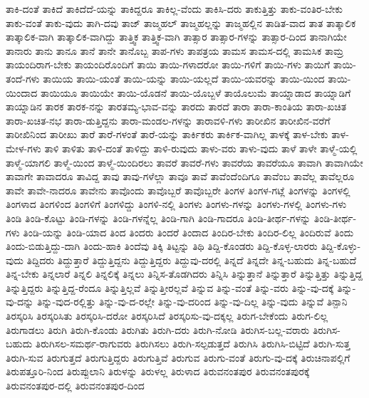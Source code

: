 {ತಾಕಿ-ದಂತೆ
ತಾಕಿದೆ
ತಾಕಿದೆದೆ-ಯನ್ನು
ತಾಕಿದ್ದರೂ
ತಾಕಿಲ್ಲ-ವೆಂದು
ತಾಕಿಸಿ-ದರು
ತಾಕುತ್ತಿತ್ತು
ತಾಕು-ವಂತಿರ-ಬೇಕು
ತಾಕು-ವಂತೆ
ತಾಕು-ವುದು
ತಾಗಿ-ದವು
ತಾಜ್
ತಾಜ್ಮಹಲ್
ತಾಜ್ಮಹಲ್ಲನ್ನು
ತಾಜ್ಮಹಲ್ಲಿನ
ತಾಡಿತ-ವಾದ
ತಾತ
ತಾತ್ಕಾಲಿಕ
ತಾತ್ಕಾಲಿಕ-ವಾಗಿ
ತಾತ್ಕಾಲಿಕ-ವಾಗಿದ್ದು
ತಾತ್ತ್ವಿಕ
ತಾತ್ತ್ವಿಕ-ವಾಗಿ
ತಾತ್ಸಾರ
ತಾತ್ಸಾರ-ಗಳನ್ನು
ತಾತ್ಸಾರ-ದಿಂದ
ತಾನಾಗಿಯೇ
ತಾನಾರು
ತಾನು
ತಾನೂ
ತಾನೆ
ತಾನೇ
ತಾನೊಬ್ಬ
ತಾಪ-ಗಳು
ತಾಪತ್ರಯ
ತಾಮಸ
ತಾಮಸ-ದಲ್ಲಿ
ತಾಮಸಿಕ
ತಾಮ್ರ
ತಾಯಂದಿರಾಗ-ಬೇಕು
ತಾಯಂದಿರೊಂದಿಗೆ
ತಾಯಿ
ತಾಯಿ-ಗಳಾದರೋ
ತಾಯಿ-ಗಳಿಗೆ
ತಾಯಿ-ಗಳು
ತಾಯಿಗೆ
ತಾಯಿ-ತಂದೆ-ಗಳು
ತಾಯಿಯ
ತಾಯಿ-ಯಂತೆ
ತಾಯಿ-ಯನ್ನು
ತಾಯಿ-ಯಲ್ಲದೆ
ತಾಯಿ-ಯವರನ್ನು
ತಾಯಿ-ಯಿಂದ
ತಾಯಿ-ಯಿಂದಾದ
ತಾಯಿಯೂ
ತಾಯಿಯೇ
ತಾಯಿ-ಯೊಡನೆ
ತಾಯಿ-ಯೊಬ್ಬಳೆ
ತಾಯೊಲುಮೆ
ತಾಯ್ನಾಡಾದ
ತಾಯ್ನಾಡಿಗೆ
ತಾಯ್ನಾಡಿನ
ತಾರಕ
ತಾರಕ-ನನ್ನು
ತಾರತಮ್ಯ-ಭಾವ-ವನ್ನು
ತಾರದು
ತಾರದೆ
ತಾರಾ
ತಾರಾ-ಕಾಂತಿಯ
ತಾರಾ-ಖಚಿತ
ತಾರಾ-ಖಚಿತ-ನಭ
ತಾರಾ-ಡುತ್ತಿದ್ದನು
ತಾರಾ-ಮಂಡಲ-ಗಳನ್ನು
ತಾರಾವಳಿ-ಗಳು
ತಾರೀಖಿನ
ತಾರೀಖಿನ-ವರೆಗೆ
ತಾರೀಖಿನಿಂದ
ತಾರೀಖು
ತಾರೆ
ತಾರೆ-ಗಳಂತೆ
ತಾರೆ-ಯನ್ನು
ತಾರ್ಕಿಕರು
ತಾರ್ಕಿಕ-ವಾಗಿಲ್ಲ
ತಾಳಕ್ಕೆ
ತಾಳ-ಬೇಕು
ತಾಳ-ಮೇಳ-ಗಳು
ತಾಳಿ
ತಾಳಿತು
ತಾಳಿ-ದಂತೆ
ತಾಳಿದ್ದು
ತಾಳಿ-ರುವುದು
ತಾಳು-ವರು
ತಾಳು-ವುದು
ತಾಳೆ
ತಾಳೇ
ತಾಳ್ಮೆ-ಯಲ್ಲಿ
ತಾಳ್ಮೆ-ಯಾಗಲಿ
ತಾಳ್ಮೆ-ಯಿಂದ
ತಾಳ್ಮೆ-ಯಿಂದಿರಲು
ತಾವರೆ
ತಾವರೆ-ಗಳು
ತಾವರೆಯ
ತಾವರೆಯೂ
ತಾವಾಗಿ
ತಾವಾಗಿಯೇ
ತಾವಾಗೇ
ತಾವಾದರೂ
ತಾವಿದ್ದ
ತಾವು
ತಾವು-ಗಳೆಲ್ಲಾ
ತಾವೂ
ತಾವೆ
ತಾವೆಂದೆಂದಿಗೂ
ತಾವೆಂಬ
ತಾವೆಲ್ಲ
ತಾವೆಲ್ಲರೂ
ತಾವೇ
ತಾವೇ-ನಾದರೂ
ತಾವೇನು
ತಾವೊಂದು
ತಾವೊಬ್ಬರೆ
ತಾವೊಬ್ಬರೇ
ತಿಂಗಳ
ತಿಂಗಳ-ಗಟ್ಲೆ
ತಿಂಗಳನ್ನು
ತಿಂಗಳಲ್ಲಿ
ತಿಂಗಳಾದ
ತಿಂಗಳಿಂದ
ತಿಂಗಳಿಗೆ
ತಿಂಗಳಿದ್ದು
ತಿಂಗಳಿ-ನಲ್ಲಿ
ತಿಂಗಳು
ತಿಂಗಳು-ಗಳನ್ನು
ತಿಂಗಳು-ಗಳಲ್ಲಿ
ತಿಂಗಳು-ಗಳು
ತಿಂಡಿ
ತಿಂಡಿ-ಕೊಟ್ಟು
ತಿಂಡಿ-ಗಳನ್ನು
ತಿಂಡಿ-ಗಳನ್ನೆಲ್ಲ
ತಿಂಡಿ-ಗಾಗಿ
ತಿಂಡಿ-ಗಾದರೂ
ತಿಂಡಿ-ತೀರ್ಥ-ಗಳನ್ನು
ತಿಂಡಿ-ತೀರ್ಥ-ಗಳು
ತಿಂಡಿ-ಯನ್ನು
ತಿಂಡಿ-ಯಾದ
ತಿಂದ
ತಿಂದರು
ತಿಂದರೆ
ತಿಂದಾದ
ತಿಂದಿರ-ಬೇಕು
ತಿಂದಿರ-ಲಿಲ್ಲ
ತಿಂದಿರುವೆ
ತಿಂದು
ತಿಂದು-ಬಿಡುತ್ತಿದ್ದು-ದಾಗಿ
ತಿಂದು-ಹಾಕಿ
ತಿಂದೆವು
ತಿಕ್ಕಿ
ತಿಟ್ಟನ್ನು
ತಿಥಿ
ತಿದ್ದಿ-ಕೊಂಡರು
ತಿದ್ದಿ-ಕೊಳ್ಳ-ಲಾರರು
ತಿದ್ದಿ-ಕೊಳ್ಳು-ವುದು
ತಿದ್ದಿದರು
ತಿದ್ದುತ್ತಾರೆ
ತಿದ್ದುತ್ತಿದ್ದನು
ತಿದ್ದುತ್ತಿದ್ದರು
ತಿದ್ದುವು-ದರಲ್ಲಿ
ತಿನ್ನದೆ
ತಿನ್ನದೇ
ತಿನ್ನ-ಬಹುದು
ತಿನ್ನ-ಬಹುದೆ
ತಿನ್ನ-ಬೇಕು
ತಿನ್ನಲಾರೆ
ತಿನ್ನಲಿ
ತಿನ್ನಲಿಕ್ಕೆ
ತಿನ್ನಲು
ತಿನ್ನಿಸ-ತೊಡಗಿದರು
ತಿನ್ನಿಸಿ
ತಿನ್ನುತ್ತಾನೆ
ತಿನ್ನುತ್ತಾರೆ
ತಿನ್ನುತ್ತಿತ್ತು
ತಿನ್ನುತ್ತಿದ್ದ
ತಿನ್ನುತ್ತಿದ್ದರು
ತಿನ್ನುತ್ತಿದ್ದ-ರೆಂದೂ
ತಿನ್ನುತ್ತಿಲ್ಲವೆ
ತಿನ್ನುತ್ತೀರಲ್ಲವೆ
ತಿನ್ನುವ
ತಿನ್ನು-ವಂತೆ
ತಿನ್ನು-ವರು
ತಿನ್ನು-ವು-ದಕ್ಕೆ
ತಿನ್ನು-ವು-ದನ್ನು
ತಿನ್ನು-ವುದ-ರಲ್ಲಿತ್ತು
ತಿನ್ನು-ವು-ದ-ರಲ್ಲೇ
ತಿನ್ನು-ವು-ದರಿಂದ
ತಿನ್ನು-ವು-ದಿಲ್ಲ
ತಿನ್ನು-ವುದು
ತಿನ್ನುವೆ
ತಿನ್ಪಾನಿ
ತಿರಸ್ಕರಿಸಿ
ತಿರಸ್ಕರಿಸಿತು
ತಿರಸ್ಕರಿಸಿ-ದರೋ
ತಿರಸ್ಕರಿಸಿದೆ
ತಿರಸ್ಕರಿಸು-ವು-ದಕ್ಕಲ್ಲ
ತಿರುಗ-ಬೇಕೆಂದು
ತಿರುಗ-ಲಿಲ್ಲ
ತಿರುಗಾಡಲು
ತಿರುಗಿ
ತಿರುಗಿ-ಕೊಂಡು
ತಿರುಗಿತು
ತಿರುಗಿ-ದರು
ತಿರುಗಿ-ನೋಡಿ
ತಿರುಗಿಸ-ಬಲ್ಲ-ವರಾರು
ತಿರುಗಿಸ-ಬಹುದು
ತಿರುಗಿಸಲ-ಸಮರ್ಥ-ರಾಗುವರು
ತಿರುಗಿಸಲು
ತಿರುಗಿ-ಸಲ್ಪಡುತ್ತದೆ
ತಿರುಗಿಸಿ
ತಿರುಗಿಸಿ-ಬಿಟ್ಟಿದೆ
ತಿರುಗಿ-ಸುತ್ತ
ತಿರುಗಿ-ಸುವ
ತಿರುಗುತ್ತದೆ
ತಿರುಗುತ್ತಿದ್ದರು
ತಿರುಗುತ್ತಿವೆ
ತಿರುಗುವ
ತಿರುಗು-ವಂತೆ
ತಿರುಗು-ವು-ದಕ್ಕೆ
ತಿರುಚಿನಾಪಲ್ಲಿಗೆ
ತಿರುಪತ್ತೂರಿ-ನಿಂದ
ತಿರುಪ್ಪುಲಾನಿ
ತಿರುಳನ್ನು
ತಿರುಳಲ್ಲ
ತಿರುಳಾದ
ತಿರುವನಂತಪುರ
ತಿರುವನಂತಪುರಕ್ಕೆ
ತಿರುವನಂತಪುರ-ದಲ್ಲಿ
ತಿರುವನಂತಪುರ-ದಿಂದ
}
